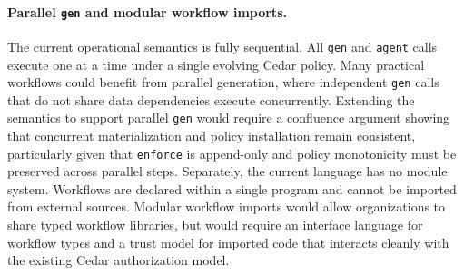 \paragraph{Parallel \texttt{gen} and modular workflow imports.}
The current operational semantics is fully sequential. All 
\texttt{gen} and \texttt{agent} calls execute one at a time under 
a single evolving Cedar policy. Many practical workflows could 
benefit from parallel generation, where independent \texttt{gen} 
calls that do not share data dependencies execute concurrently. 
Extending the semantics to support parallel \texttt{gen} would 
require a confluence argument showing that concurrent 
materialization and policy installation remain consistent, 
particularly given that \texttt{enforce} is append-only and 
policy monotonicity must be preserved across parallel steps. 
Separately, the current language has no module system. Workflows 
are declared within a single program and cannot be imported from 
external sources. Modular workflow imports would allow 
organizations to share typed workflow libraries, but would require 
an interface language for workflow types and a trust model for 
imported code that interacts cleanly with the existing Cedar 
authorization model.